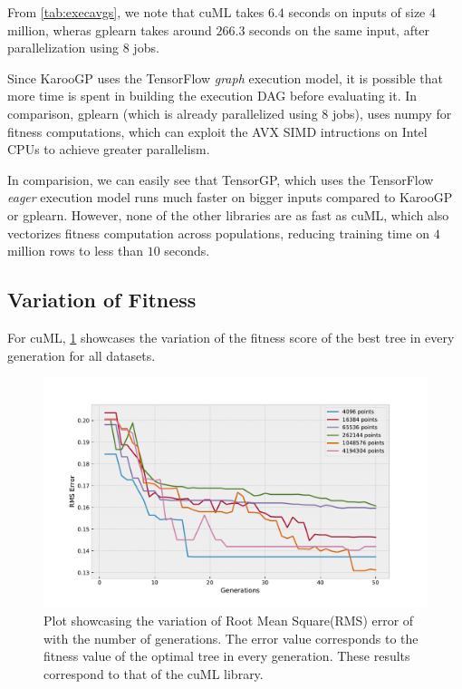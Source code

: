From \cref{tab:execavgs}, we note that cuML takes $6.4$ seconds on inputs of size $4$ million, wheras gplearn takes around $266.3$ seconds on the same input, after parallelization using $8$ jobs.

Since KarooGP uses the TensorFlow \textit{graph} execution model, it is possible that more time is spent in building the execution DAG before evaluating it. In comparison, gplearn (which is already parallelized using $8$ jobs), uses numpy for fitness computations, which can exploit the AVX SIMD intructions on Intel CPUs to achieve greater parallelism. 

In comparision, we can easily see that TensorGP, which uses the TensorFlow \textit{eager} execution model runs much faster on bigger inputs compared to KarooGP or gplearn. However, none of the other libraries are as fast as cuML, which also vectorizes fitness computation across populations, reducing training time on $4$ million rows to less than $10$ seconds.

\subsection{Variation of Fitness}
\label{subsec:fitnessvar}


For cuML, \cref{fig:besttrainfit} showcases the variation of the fitness score of the best tree in every generation for all datasets. 

\begin{figure}[htbp]
  \centering
  \includegraphics[scale=0.59]{images/RMSError.pdf}
  \caption{Plot showcasing the variation of Root Mean Square(RMS) error of with the number of generations. The error value corresponds to the fitness value of the optimal tree in every generation. These results correspond to that of the cuML library. }
  \label{fig:besttrainfit}
\end{figure}

